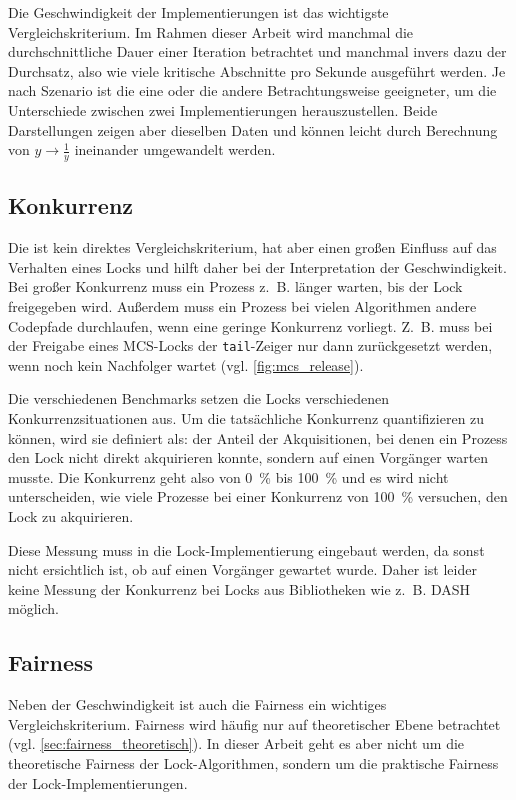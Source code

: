 Die Geschwindigkeit der Implementierungen ist das wichtigste Vergleichskriterium.
Im Rahmen dieser Arbeit wird manchmal die durchschnittliche Dauer einer Iteration betrachtet
und manchmal invers dazu der Durchsatz,
also wie viele kritische Abschnitte pro Sekunde ausgeführt werden.
Je nach Szenario ist die eine oder die andere Betrachtungsweise geeigneter,
um die Unterschiede zwischen zwei Implementierungen herauszustellen.
Beide Darstellungen zeigen aber dieselben Daten
und können leicht durch Berechnung von $y \rightarrow \frac{1}{y}$ ineinander umgewandelt werden.

\subsection{Konkurrenz}
\label{sec:contention}

Die  ist kein direktes Vergleichskriterium,
hat aber einen großen Einfluss auf das Verhalten eines Locks
und hilft daher bei der Interpretation der Geschwindigkeit.
Bei großer \gls{Konkurrenz} muss ein Prozess z.~B. länger warten,
bis der Lock freigegeben wird.
Außerdem muss ein Prozess bei vielen Algorithmen andere Codepfade durchlaufen,
wenn eine geringe \gls{Konkurrenz} vorliegt.
Z.~B. muss bei der Freigabe eines MCS-Locks
der \texttt{tail}-Zeiger nur dann zurückgesetzt werden,
wenn noch kein Nachfolger wartet (vgl. \autoref{fig:mcs_release}).

Die verschiedenen Benchmarks setzen die Locks verschiedenen \gls{Konkurrenz}situationen aus.
Um die tatsächliche \gls{Konkurrenz} quantifizieren zu können,
wird sie definiert als:
der Anteil der Akquisitionen,
bei denen ein Prozess den Lock nicht direkt akquirieren konnte,
sondern auf einen Vorgänger warten musste.
Die \gls{Konkurrenz} geht also von 0~\% bis 100~\%
und es wird nicht unterscheiden,
wie viele Prozesse bei einer \gls{Konkurrenz} von 100~\% versuchen,
den Lock zu akquirieren.

Diese Messung muss in die Lock-Implementierung eingebaut werden,
da sonst nicht ersichtlich ist,
ob auf einen Vorgänger gewartet wurde.
Daher ist leider keine Messung der \gls{Konkurrenz} bei Locks aus Bibliotheken wie z.~B. DASH möglich.

\subsection{Fairness}
\label{sec:fairness_empirisch}

Neben der Geschwindigkeit ist auch die Fairness ein wichtiges Vergleichskriterium.
Fairness wird häufig nur auf theoretischer Ebene betrachtet (vgl. \autoref{sec:fairness_theoretisch}).
In dieser Arbeit geht es aber nicht um die theoretische Fairness der Lock-Algorithmen,
sondern um die praktische Fairness der Lock-Implementierungen.


